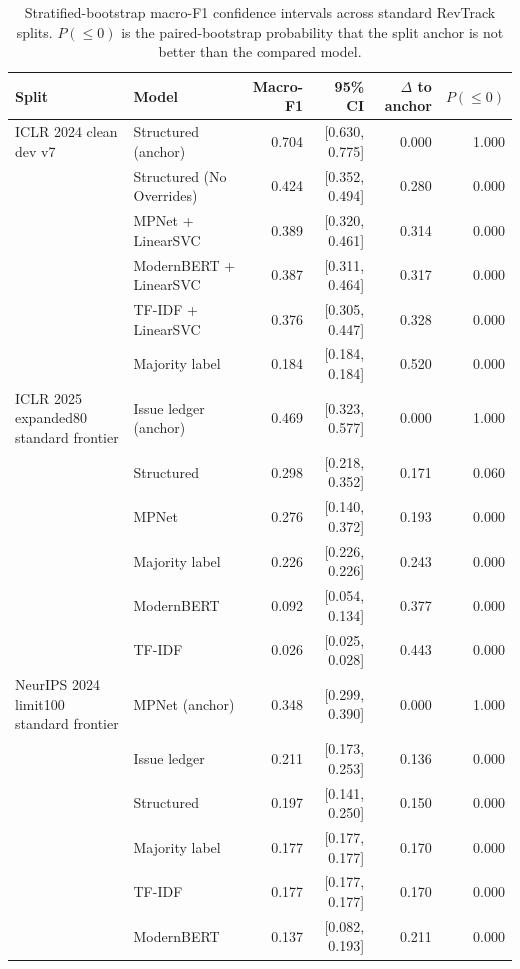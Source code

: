 \begin{table}[t]
\centering
\scriptsize
\setlength{\tabcolsep}{3pt}
\begin{tabular}{p{}p{}rrrr}
\toprule
Split & Model & Macro-F1 & 95\% CI & $\Delta$ to anchor & $P(\leq 0)$ \\
\midrule
ICLR 2024 clean dev v7 & Structured (anchor) & 0.704 & [0.630, 0.775] & 0.000 & 1.000 \\
 & Structured (No Overrides) & 0.424 & [0.352, 0.494] & 0.280 & 0.000 \\
 & MPNet + LinearSVC & 0.389 & [0.320, 0.461] & 0.314 & 0.000 \\
 & ModernBERT + LinearSVC & 0.387 & [0.311, 0.464] & 0.317 & 0.000 \\
 & TF-IDF + LinearSVC & 0.376 & [0.305, 0.447] & 0.328 & 0.000 \\
 & Majority label & 0.184 & [0.184, 0.184] & 0.520 & 0.000 \\
\midrule
ICLR 2025 expanded80 standard frontier & Issue ledger (anchor) & 0.469 & [0.323, 0.577] & 0.000 & 1.000 \\
 & Structured & 0.298 & [0.218, 0.352] & 0.171 & 0.060 \\
 & MPNet & 0.276 & [0.140, 0.372] & 0.193 & 0.000 \\
 & Majority label & 0.226 & [0.226, 0.226] & 0.243 & 0.000 \\
 & ModernBERT & 0.092 & [0.054, 0.134] & 0.377 & 0.000 \\
 & TF-IDF & 0.026 & [0.025, 0.028] & 0.443 & 0.000 \\
\midrule
NeurIPS 2024 limit100 standard frontier & MPNet (anchor) & 0.348 & [0.299, 0.390] & 0.000 & 1.000 \\
 & Issue ledger & 0.211 & [0.173, 0.253] & 0.136 & 0.000 \\
 & Structured & 0.197 & [0.141, 0.250] & 0.150 & 0.000 \\
 & Majority label & 0.177 & [0.177, 0.177] & 0.170 & 0.000 \\
 & TF-IDF & 0.177 & [0.177, 0.177] & 0.170 & 0.000 \\
 & ModernBERT & 0.137 & [0.082, 0.193] & 0.211 & 0.000 \\
\bottomrule
\end{tabular}
\caption{Stratified-bootstrap macro-F1 confidence intervals across standard RevTrack splits. $P(\leq 0)$ is the paired-bootstrap probability that the split anchor is not better than the compared model.}
\label{tab:cross-split-significance}
\end{table}
